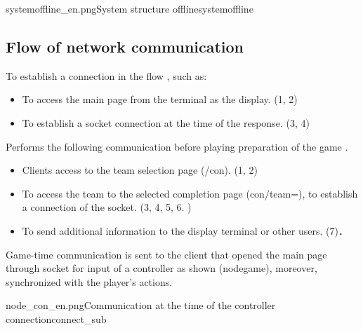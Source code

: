 {systemoffline_en.png}{System structure offline}{systemoffline}

\subsection{Flow of network communication}
To establish a connection in the flow , such as:
\begin{itemize}
    \item To access the main page from the terminal as the display. (1, 2)
    \item To establish a socket connection at the time of the response. (3, 4)
\end{itemize}

Performs the following communication before playing preparation of the game .

\begin{itemize}
    \item Clients access to the team selection page (/con). (1, 2)
    \item To access the team to the selected completion page (con/team=), to establish a connection of the socket. (3, 4, 5, 6. )
    \item To send additional information to the display terminal or other users. (7)．
\end{itemize}

Game-time communication is sent to the client that opened the main page through socket for input of a controller as shown \figref(nodegame),
moreover, synchronized with the player's actions.

{node_con_en.png}{Communication at the time of the controller connection}{connect_sub}


\newpage

